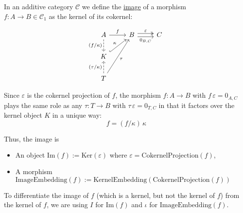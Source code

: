\begin{definition}[Image]
In an additive category $\mathcal{C}$ we define the \ul{image} of a morphism\\
$f : A \rightarrow B \in \mathcal{C}_{1}$ as the kernel of its cokernel:\\
\begin{minipage}{.06\textwidth} \phantom{} \end{minipage}
\begin{minipage}{.39\textwidth}
\[
\begin{tikzcd}[
  ampersand replacement=\&,
]
A \arrow[r, "f"] \arrow[d, "(f/\kappa)"', dashed]         \& B \arrow[r, "\varepsilon", shift left, two heads] \arrow[r, "{0_{B,C}}"', shift right] \& C \\
K \arrow[ru, "\kappa", hook]                                    \&                            \&   \\
T \arrow[u, "(\tau/\kappa)", dashed] \arrow[ruu, "\tau"'] \&                            \&  
\end{tikzcd}
\]
\end{minipage}
\begin{minipage}{.49\textwidth}
Since $\varepsilon$ is the cokernel projection of $f$, the morphism $f : A \rightarrow B$ with $f\,\varepsilon = 0_{A,C}$ plays the
same role as any $\tau : T \rightarrow B$ with $\tau\,\varepsilon = 0_{T,C}$ in that it factors over the kernel object $K$ in a
unique way: 
\[
f = (f/\kappa)\,\kappa
\]
\end{minipage}
\begin{minipage}{.06\textwidth} \phantom{} \end{minipage}

Thus, the image is
\begin{itemize}
\item An object $\mathrm{Im}(f) := \mathrm{Ker}(\varepsilon)$ where $\varepsilon = \mathrm{CokernelProjection}(f)$,
\item A morphism $\mathrm{ImageEmbedding}(f) := \mathrm{KernelEmbedding}(\mathrm{CokernelProjection}(f))$
\end{itemize}
To differentiate the image of $f$ (which is a kernel, but not the kernel of $f$) from the kernel of $f$,
we are using $I$ for $\mathrm{Im}(f)$ and $\iota$ for $\mathrm{ImageEmbedding}(f)$.
\end{definition}

